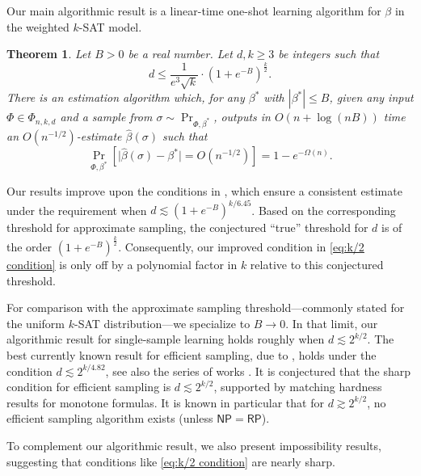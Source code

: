 \documentclass[11pt]{article}
\newtheorem{theorem}{Theorem}[section]
\theoremstyle{definition}
\theoremstyle{remark}
\begin{document}
Our main algorithmic result is a linear-time one-shot learning algorithm for $\beta$ in the weighted $k$-SAT model.           \begin{theorem}
\label{thm: algo bound}
    Let $B > 0$ be  a real number. Let $d,k\geq 3$ be integers such that 
    \begin{equation} \label{eq:k/2 condition}
        d\le \frac{1}{e^3\sqrt{k}} \cdot (1+e^{-B})^{\frac{k}{2}}.
    \end{equation} 
    There is an estimation algorithm
    which, for any $\beta^*$ with $|\beta^*| \leq B$,
    given any input $\Phi \in \Phi_{n,k,d}$ and a sample from $\sigma \sim \Pr_{\Phi, \beta^*}$, outputs in $O(n + \log (nB))$ time  an $O(n^{-1/2})$-estimate 
    $\hat{\beta}(\sigma)$ such that 
    \[
    \Pr_{\Phi, \beta^*}\left[
    \big|\hat{\beta}(\sigma) - \beta^*\big| = O(n^{-1/2}) \right] = 1- e^{-\Omega(n)}.
    \]
\end{theorem}

Our results improve upon the conditions in \cite{GKK24}, which ensure a consistent estimate under the requirement when $d\lesssim (1+e^{-B})^{k/6.45}$. Based on the corresponding threshold for approximate sampling, the conjectured “true” threshold for $d$ is of the order $(1+e^{-B})^{\frac{k}{2}}$. Consequently, our improved condition in \eqref{eq:k/2 condition} is only off by a polynomial factor in $k$ relative to this conjectured threshold.

For comparison with the approximate sampling threshold—commonly stated for the uniform $k$-SAT distribution—we specialize to 
$B\rightarrow0$.  In that limit, our algorithmic result for single-sample learning holds roughly when
$d\lesssim 2^{k/2}$.
The best currently known result for efficient sampling, due to \cite{WangYin24}, holds under the condition $d\lesssim 2^{k/4.82}$, see also the series of works \cite{Moitra19, FGYZ21a, JPV21b, HWY23a}. It is conjectured that the sharp condition for efficient sampling is $d\lesssim 2^{k/2}$, supported by matching hardness results for monotone formulas. It is known in particular that for $d\gtrsim 2^{k/2}$, no efficient sampling algorithm exists (unless $\mathsf{NP} = \mathsf{RP}$).

To complement our algorithmic result, we also present impossibility results, suggesting that conditions like \eqref{eq:k/2 condition} are nearly sharp.
    
 
\end{document}
